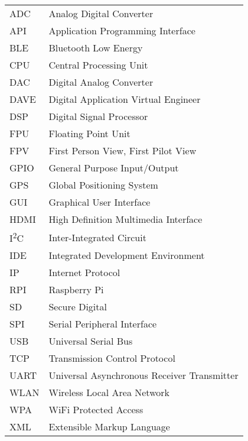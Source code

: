 

\begin{singlespace}
\begin{flushleft}
\begin{longtable}{p{2 cm}p{14 cm}}
  ADC & Analog Digital Converter \\
  API & Application Programming Interface \\
  BLE & Bluetooth Low Energy \\
  CPU & Central Processing Unit \\
  DAC & Digital Analog Converter \\
  DAVE & Digital Application Virtual Engineer \\
  DSP & Digital Signal Processor \\
  FPU & Floating Point Unit \\
  FPV & First Person View, First Pilot View \\
  GPIO & General Purpose Input/Output \\
  GPS & Global Positioning System \\
  GUI & Graphical User Interface \\	
  HDMI & High Definition Multimedia Interface \\
  I\textsuperscript{2}C & Inter-Integrated Circuit \\
  IDE & Integrated Development Environment \\
  IP & Internet Protocol \\
  RPI & Raspberry Pi \\
  SD & Secure Digital \\
  SPI & Serial Peripheral Interface \\
  USB & Universal Serial Bus \\
  TCP & Transmission Control Protocol \\
  UART & Universal Asynchronous Receiver Transmitter \\
  WLAN & Wireless Local Area Network \\
  WPA & WiFi Protected Access \\
  XML & Extensible Markup Language \\
\end{longtable}
\end{flushleft}
\end{singlespace}
